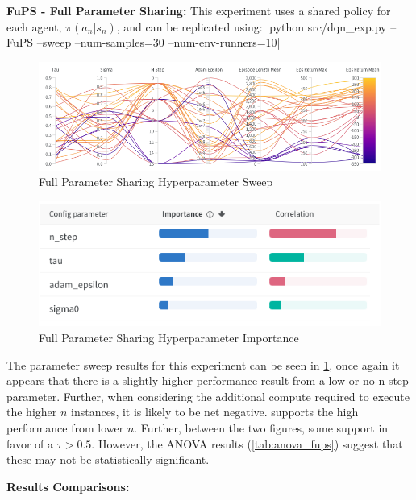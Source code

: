 \documentclass[12pt,letterpaper]{exam}
\begin{document}
\begin{questions}
    \phantom{text} \\ \\


    \question \textbf{FuPS - Full Parameter Sharing:}
    This experiment uses a shared policy for each agent, 
    \(\pi(a_n|s_n)\), and can be replicated using:
|python src/dqn_exp.py --FuPS --sweep --num-samples=30 --num-env-runners=10|

    \begin{figure}
        \centering
        \includegraphics[width=.95\linewidth]{para_coord_fups.png}
        \caption{Full Parameter Sharing Hyperparameter Sweep}
        \label{fig:fups_para}
    \end{figure}

    \begin{figure}
        \centering
        \includegraphics[width=.5\linewidth]{importance_fups.png}
        \caption{Full Parameter Sharing Hyperparameter Importance}
        \label{fig:fups_importance}
    \end{figure}

    The parameter sweep results for this experiment can be seen in 
    \cref{fig:fups_para}, once again it appears that there is a 
    slightly higher performance result from a low or no n-step parameter.
    Further, when considering the additional compute required to execute
    the higher \(n\) instances, it is likely to be net negative.
     supports the high performance from lower \(n\).
    Further, between the two figures, some support in favor of a \(\tau>0.5\).
    However, the ANOVA results (\cref{tab:anova_fups}) suggest that these
    may not be statistically significant.

\question \textbf{Results Comparisons:}


\end{questions}
\end{document}
